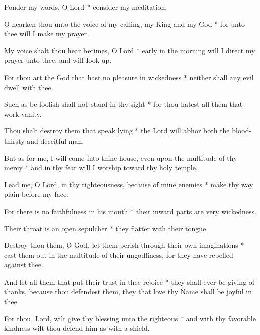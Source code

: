 Ponder my words, O Lord * consider my meditation.

O hearken thou unto the voice of my calling, my King and my God * for unto thee will I make my prayer.

My voice shalt thou hear betimes, O Lord * early in the morning will I direct my prayer unto thee, and will look up.

For thou art the God that hast no pleasure in wickedness * neither shall any evil dwell with thee.

Such as be foolish shall not stand in thy sight * for thou hatest all them that work vanity.

Thou shalt destroy them that speak lying * the Lord will abhor both the blood-thirsty and deceitful man.

But as for me, I will come into thine house, even upon the multitude of thy mercy * and in thy fear will I worship toward thy holy temple.

Lead me, O Lord, in thy righteousness, because of mine enemies * make thy way plain before my face.

For there is no faithfulness in his mouth * their inward parts are very wickedness.

Their throat is an open sepulcher * they flatter with their tongue.

Destroy thou them, O God, let them perish through their own imaginations * cast them out in the multitude of their ungodliness, for they have rebelled against thee.

And let all them that put their trust in thee rejoice * they shall ever be giving of thanks, because thou defendest them, they that love thy Name shall be joyful in thee.

For thou, Lord, wilt give thy blessing unto the righteous * and with thy favorable kindness wilt thou defend him as with a shield.